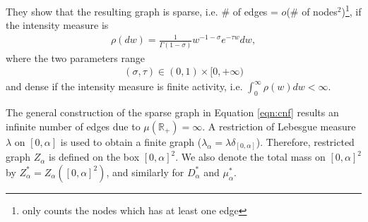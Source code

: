 \documentclass{article}
\begin{document}
They show that the resulting graph is sparse, i.e. \# of edges = $o$(\# of nodes$^2$)\footnote{only counts the nodes which has at least one edge}, if the intensity measure is
\begin{align}
\rho(dw) = \frac{1}{\Gamma(1-\sigma)}w^{-1-\sigma}e^{-\tau w}dw,
\end{align}
where the two parameters range
\begin{align}
(\sigma, \tau) \in (0,1) \times [0, +\infty)
\end{align}
and dense if the intensity measure is finite activity, i.e. $\int_{0}^{\infty} \rho(w)dw < \infty$.

The general construction of the sparse graph in Equation \ref{eqn:cnf} results an infinite number of edges due to $\mu(\mathbb{R}_+) = \infty$. A restriction of Lebesgue measure $\lambda$ on $[0, \alpha]$ is used to obtain a finite graph ($\lambda_\alpha = \lambda\delta_{[0, \alpha]}$). Therefore, restricted graph $Z_\alpha$ is defined on the box $[0,\alpha]^2$. We also denote the total mass on $[0, \alpha]^2$ by $Z_\alpha^* = Z_\alpha([0, \alpha]^2)$, and similarly for $D_\alpha^*$ and $\mu_\alpha^*$.
\end{document}
